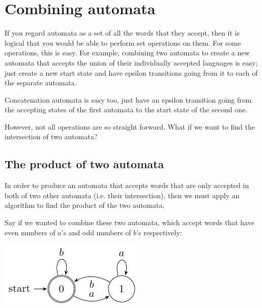 
\section{Combining automata}

If you regard automata as a set of all the words that they accept, then it is
logical that you would be able to perform set operations on them. For some
operations, this is easy. For example, combining two automata to create a new
automata that accepts the union of their individually accepted languages is
easy; just create a new start state and have epsilon transitions going from it
to each of the separate automata.

Concatenation automata is easy too, just have an epsilon transition going from
the accepting states of the first automata to the start state of the second one.

However, not all operations are so straight forward. What if we want to find the
intersection of two automata?

\subsection{The product of two automata}
\label{sub:product_of_automata}

In order to produce an automata that accepts words that are only accepted in
both of two other automata (i.e. their intersection), then we must apply an
algorithm to find the product of the two automata.

Say if we wanted to combine these two automata, which accept words that have
even numbers of $a$'s and odd numbers of $b$'s respectively:

\begin{center}
  \includegraphics{automata/28.pdf}
\end{center}

